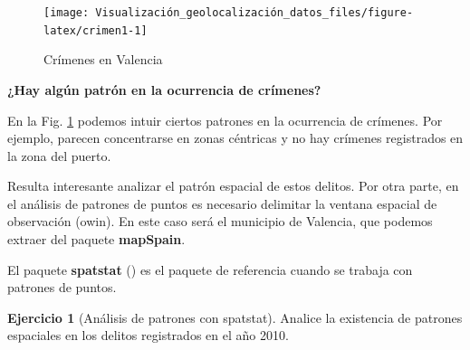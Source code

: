 \documentclass[
]{book}
\theoremstyle{definition}
\theoremstyle{definition}
\theoremstyle{definition}
\newtheorem{exercise}{Ejercicio}[chapter]
\theoremstyle{definition}
\theoremstyle{remark}
\begin{document}
\begin{figure}

{\centering \texttt{[image: Visualización\_geolocalización\_datos\_files/figure-latex/crimen1-1]} 

}

\caption{Crímenes en Valencia}\label{fig:crimen1}
\end{figure}

\textbf{¿Hay algún patrón en la ocurrencia de crímenes?}

En la Fig. \ref{fig:crimen1} podemos intuir ciertos patrones en la ocurrencia
de crímenes. Por ejemplo, parecen concentrarse en zonas céntricas y no hay
crímenes registrados en la zona del puerto.

Resulta interesante analizar el patrón espacial de estos delitos. Por otra
parte, en el análisis de patrones de puntos es necesario delimitar la ventana
espacial de observación (owin). En este caso será el municipio de Valencia, que
podemos extraer del paquete \textbf{mapSpain}.

El paquete \textbf{spatstat} (\citet{spatstat_2005}) es el paquete de referencia cuando se
trabaja con patrones de puntos.

\begin{exercise}[Análisis de patrones con spatstat]
\protect\hypertarget{exr:ex30}{}\label{exr:ex30}Analice la existencia de patrones espaciales en los delitos registrados en el
año 2010.
\end{exercise}
\end{document}
